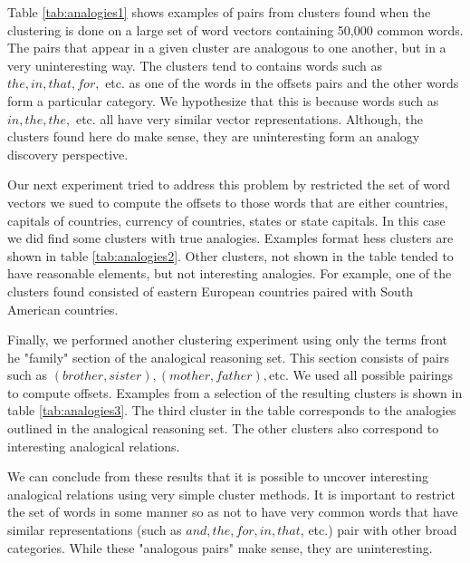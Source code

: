 Table \ref{tab:analogies1} shows examples of pairs from clusters found when the clustering is done on a large set of word vectors containing 50,000 common words. The pairs that appear in a given cluster are analogous to one another, but in a very uninteresting way. The clusters tend to contains words such as $the, in, that, for,$ etc. as one of the words in the offsets pairs and the other words form a particular category. We hypothesize that this is because words such as $in, the, the,$ etc. all have very similar vector representations. Although, the clusters found here do make sense, they are uninteresting form an analogy discovery perspective. 

Our next experiment tried to address this problem by restricted the set of word vectors we sued to compute the offsets to those words that are either countries, capitals of countries, currency of countries, states or state capitals. In this case we did find some clusters with true analogies. Examples format hess clusters are shown in table \ref{tab:analogies2}. Other clusters, not shown in the table tended to have reasonable elements, but not interesting analogies. For example, one of the clusters found consisted of eastern European countries paired with South American countries. 

Finally, we performed another clustering experiment using only the terms front he "family" section of the analogical reasoning set. This section consists of pairs such as $(brother, sister), (mother, father), $etc. We used all possible pairings to compute offsets. Examples from a selection of the resulting clusters is shown in table \ref{tab:analogies3}. The third cluster in the table corresponds to the analogies outlined in the analogical reasoning set. The other clusters also correspond to interesting analogical relations. 

We can conclude from these results that it is possible to uncover interesting analogical relations using very simple cluster methods. It is important to restrict the set of words in some manner so as not to have very common words that have similar representations (such as $and, the, for, in, that$, etc.) pair with other broad categories. While these "analogous pairs" make sense, they are uninteresting. 

